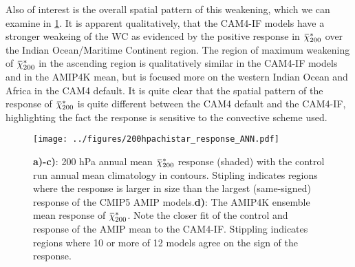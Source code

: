 \documentclass[letterpaper,12pt,titlepage,oneside,final]{book}
\newcommand{\overbar}[1]{\mkern 1.5mu\overline{\mkern-1.5mu#1\mkern-1.5mu}\mkern 1.5mu}
\begin{document}
Also of interest is the overall spatial pattern of this weakening, which we can examine in \ref{fig:chi200response}. It is apparent qualitatively, that the CAM4-IF models have a stronger weakeing of the WC as evidenced by the positive response in $\overbar{\chi}_{200}^{*}$ over the Indian Ocean/Maritime Continent region. The region of maximum weakening of $\overbar{\chi}_{200}^{*}$ in the ascending region is qualitatively similar in the CAM4-IF models and in the AMIP4K mean, but is focused more on the western Indian Ocean and Africa in the CAM4 default. It is quite clear that the spatial pattern of the response of $\overbar{\chi}_{200}^{*}$ is quite different between the CAM4 default and the CAM4-IF, highlighting the fact the response is sensitive to the convective scheme used.
\begin{figure}[H]
\centering
\noindent\texttt{[image: ../figures/200hpachistar\_response\_ANN.pdf]}\hfill
\caption{\textbf{a)-c)}: 200 hPa annual mean $\overbar{\chi}^{*}_{200}$ response (shaded) with the control run annual mean climatology in contours. Stipling indicates regions where the response is larger in size than the largest (same-signed) response of the CMIP5 AMIP models.\textbf{d)}: The AMIP4K ensemble mean response of $\overbar{\chi}^{*}_{200}$. Note the closer fit of the control and response of the AMIP mean to the CAM4-IF. Stippling indicates regions where 10 or more of 12 models agree on the sign of the response.}
\label{fig:chi200response}
\end{figure}

\end{document}

